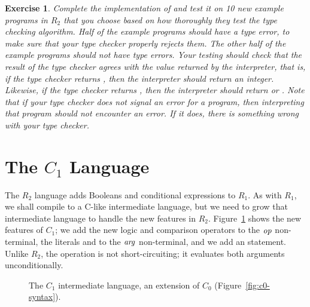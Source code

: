 \documentclass[11pt]{book}
\newtheorem{exercise}[theorem]{Exercise}
\begin{document}
\begin{exercise}\normalfont
Complete the implementation of  and test it on 10
new example programs in $R_2$ that you choose based on how thoroughly
they test the type checking algorithm. Half of the example programs
should have a type error, to make sure that your type checker properly
rejects them. The other half of the example programs should not have
type errors. Your testing should check that the result of the type
checker agrees with the value returned by the interpreter, that is, if
the type checker returns , then the interpreter should
return an integer. Likewise, if the type checker returns
, then the interpreter should return  or
. Note that if your type checker does not signal an error
for a program, then interpreting that program should not encounter an
error.  If it does, there is something wrong with your type checker.
\end{exercise}

\section{The $C_1$ Language}
\label{sec:c1}

The $R_2$ language adds Booleans and conditional expressions to $R_1$.
As with $R_1$, we shall compile to a C-like intermediate language, but
we need to grow that intermediate language to handle the new features
in $R_2$. Figure~\ref{fig:c1-syntax} shows the new features of $C_1$;
we add the new logic and comparison operators to the $\mathit{op}$
non-terminal, the literals  and  to the $\mathit{arg}$
non-terminal, and we add an  statement. Unlike $R_2$, the
 operation is not short-circuiting; it evaluates both
arguments unconditionally.

\begin{figure}[tbp]
\caption{The $C_1$ intermediate language, an extension of $C_0$
  (Figure~\ref{fig:c0-syntax}).}
\label{fig:c1-syntax}
\end{figure}
\end{document}
